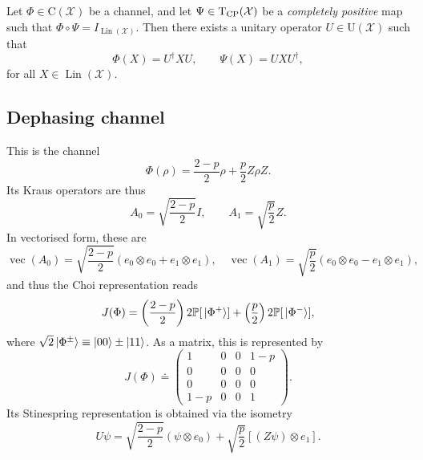 \documentclass[12pt]{report}
\newcommand{\PP}{\mathbb{P}}
\newcommand{\on}[1]{\operatorname{#1}}
\newcommand{\calX}{{\mathcal{X}}}
\newcommand{\rmC}{{\mathrm{C}}}
\newcommand{\rmT}{{\mathrm{T}}}
\newcommand{\rmU}{{\mathrm{U}}}
\DeclareMathOperator{\Lin}{Lin}
\begin{document}
\begin{prop}
	Let $\Phi\in\rmC(\calX)$ be a channel, and let $\Psi\in\rmT_{\rm CP}(\calX)$ be a \emph{completely positive} map such that
	$\Phi\circ\Psi=I_{\Lin(\calX)}$.
	Then there exists a unitary operator $U\in\rmU(\calX)$ such that
	\begin{equation}
		\Phi(X) = U^\dagger X U,
		\qquad
		\Psi(X) = UXU^\dagger,
	\end{equation}
	for all $X\in\Lin(\calX)$.
\end{prop}

\subsection{Dephasing channel}

This is the channel
\begin{equation}
	\Phi(\rho) = \frac{2-p}{2} \rho + \frac{p}{2} Z\rho Z.
\end{equation}
Its Kraus operators are thus
\begin{equation}
	A_0 = \sqrt{\frac{2-p}{2}} I,
	\qquad
	A_1 = \sqrt{\frac{p}{2}} Z.
\end{equation}
In vectorised form, these are
\begin{equation}
	\on{vec}(A_0) = \sqrt{\frac{2-p}{2}} (e_0\otimes e_0 + e_1\otimes e_1),
	\quad
	\on{vec}(A_1) = \sqrt{\frac{p}{2}} (e_0\otimes e_0 - e_1\otimes e_1),
\end{equation}
and thus the Choi representation reads
\begin{equation}
	J(\Phi) =
	\left(\frac{2-p}{2}\right) 2\PP[\ket*{\Phi^+}]
	+ \left(\frac{p}{2}\right) 2\PP[\ket*{\Phi^-}],
\end{equation}
where $\sqrt2\ket*{\Phi^\pm}\equiv \ket{00}\pm\ket{11}$.
As a matrix, this is represented by
\begin{equation}
	J(\Phi) \doteq
	\begin{pmatrix}
		1 & 0 & 0 & 1- p \\
		0 & 0 & 0 & 0 \\
		0 & 0 & 0 & 0 \\
		1 - p & 0 & 0 & 1
	\end{pmatrix}.
\end{equation}
Its Stinespring representation is obtained via the isometry
\begin{equation}
	U \psi = 
	\sqrt{\frac{2-p}{2}} (\psi\otimes e_0)
	+ \sqrt{\frac{p}{2}} [(Z\psi)\otimes e_1].
\end{equation}
\end{document}
